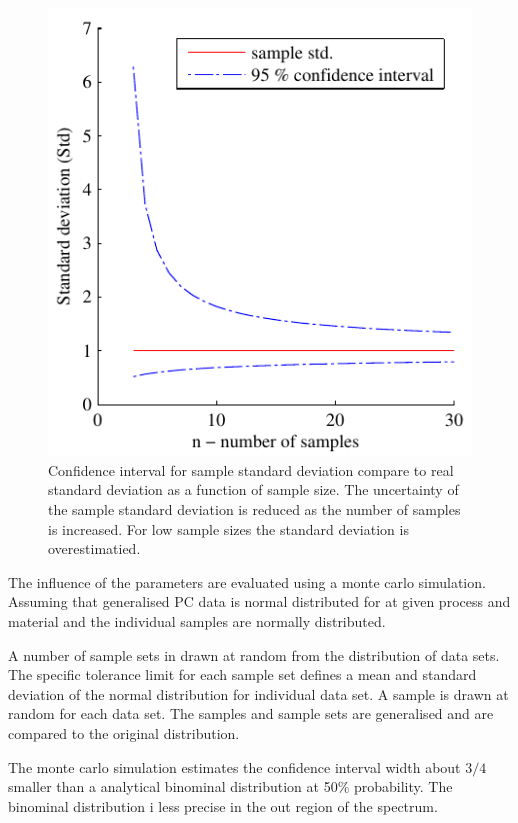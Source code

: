 \documentclass[aip,amsmath, reprint, author-year]{revtex4-1}
\begin{document}
\begin{figure}
\includegraphics{stats_std_confidence.pdf}
\caption{\label{fig:std_uncertainty}Confidence interval for sample standard deviation compare to real standard deviation as a function of sample size. The uncertainty of the sample standard deviation is reduced as the number of samples is increased. For low sample sizes the standard deviation is overestimatied.}
\end{figure}

The influence of the parameters are evaluated using a monte carlo simulation. Assuming that generalised PC data is normal distributed for at given process and material and the individual samples are normally distributed.

A number of sample sets in drawn at random from the distribution of data sets. The specific tolerance limit for each sample set defines a mean and standard deviation of the normal distribution for individual data set. A sample is drawn at random for each data set. The samples and sample sets are generalised and are compared to the original distribution.

The monte carlo simulation estimates the confidence interval width about $3/4$ smaller than a analytical binominal distribution at 50\% probability. The binominal distribution i less precise in the out region of the spectrum.
\end{document}
